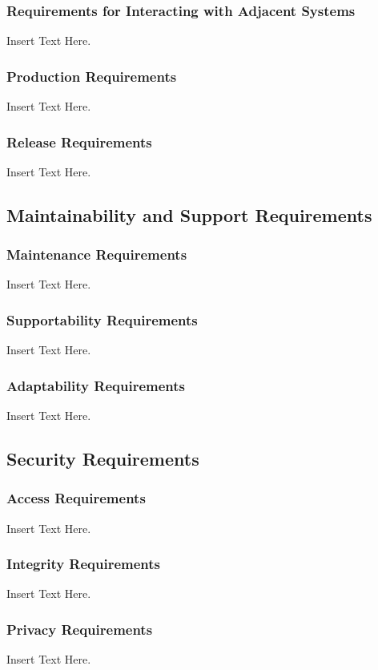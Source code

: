 \documentclass [12pt]{article}
\begin{document}
\subsubsection{Requirements for Interacting with Adjacent Systems}
		Insert Text Here.

\subsubsection{Production Requirements}
		Insert Text Here. 

\subsubsection{Release Requirements}
		Insert Text Here.		

\subsection{Maintainability and Support Requirements }
\subsubsection{Maintenance Requirements }
		Insert Text Here.

\subsubsection{Supportability Requirements }
		Insert Text Here.

\subsubsection{Adaptability Requirements}
		Insert Text Here.


\subsection{Security Requirements }
\subsubsection{Access Requirements }
		Insert Text Here.

\subsubsection{Integrity Requirements }
		Insert Text Here.

\subsubsection{Privacy Requirements }
		Insert Text Here.
\end{document}
